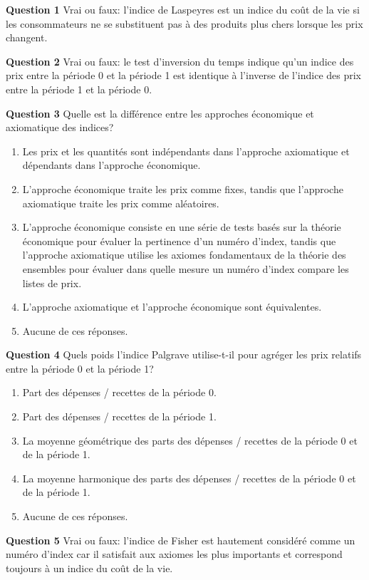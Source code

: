 \documentclass[]{article}
\begin{document}
\textbf{Question 1} Vrai ou faux: l'indice de Laspeyres est un indice du coût de la vie si les consommateurs ne se substituent pas à des produits plus chers lorsque les prix changent.

\textbf{Question 2} Vrai ou faux: le test d'inversion du temps indique qu'un indice des prix entre la période 0 et la période 1 est identique à l'inverse de l'indice des prix entre la période 1 et la période 0.

\textbf{Question 3} Quelle est la différence entre les approches économique et axiomatique des indices?

\begin{enumerate}
\def\labelenumi{\alph{enumi})}
\item
  Les prix et les quantités sont indépendants dans l'approche axiomatique et dépendants dans l'approche économique.
\item
  L'approche économique traite les prix comme fixes, tandis que l'approche axiomatique traite les prix comme aléatoires.
\item
  L'approche économique consiste en une série de tests basés sur la théorie économique pour évaluer la pertinence d'un numéro d'index, tandis que l'approche axiomatique utilise les axiomes fondamentaux de la théorie des ensembles pour évaluer dans quelle mesure un numéro d'index compare les listes de prix.
\item
  L'approche axiomatique et l'approche économique sont équivalentes.
\item
  Aucune de ces réponses.
\end{enumerate}

\textbf{Question 4} Quels poids l'indice Palgrave utilise-t-il pour agréger les prix relatifs entre la période 0 et la période 1?

\begin{enumerate}
\def\labelenumi{\alph{enumi})}
\item
  Part des dépenses / recettes de la période 0.
\item
  Part des dépenses / recettes de la période 1.
\item
  La moyenne géométrique des parts des dépenses / recettes de la période 0 et de la période 1.
\item
  La moyenne harmonique des parts des dépenses / recettes de la période 0 et de la période 1.
\item
  Aucune de ces réponses.
\end{enumerate}

\textbf{Question 5} Vrai ou faux: l'indice de Fisher est hautement considéré comme un numéro d'index car il satisfait aux axiomes les plus importants et correspond toujours à un indice du coût de la vie.
\end{document}
